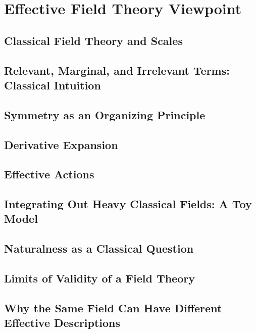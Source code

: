 \chapter{Effective Field Theory Viewpoint}

\section{Classical Field Theory and Scales}
\section{Relevant, Marginal, and Irrelevant Terms: Classical Intuition}
\section{Symmetry as an Organizing Principle}
\section{Derivative Expansion}
\section{Effective Actions}
\section{Integrating Out Heavy Classical Fields: A Toy Model}
\section{Naturalness as a Classical Question}
\section{Limits of Validity of a Field Theory}
\section{Why the Same Field Can Have Different Effective Descriptions}
